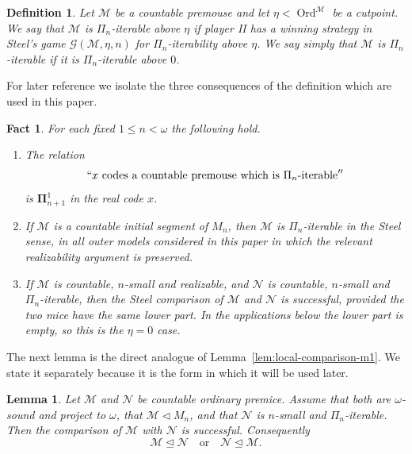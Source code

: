 \documentclass[a4paper,11pt]{article}
\newtheorem{lemma}[theorem]{Lemma}
\newtheorem{definition}[theorem]{Definition}
\newtheorem{fact}[theorem]{Fact}
\begin{document}
\begin{definition}\label{def:pin-iterability}
Let $\mathcal M$ be a countable premouse and let $\eta<\operatorname{Ord}^{\mathcal M}$ be a cutpoint.  We say that $\mathcal M$ is \emph{$\Pi_n$-iterable above $\eta$} if player II has a winning strategy in Steel's game $\mathcal G(\mathcal M,\eta,n)$ for $\Pi_n$-iterability above $\eta$.  We say simply that $\mathcal M$ is \emph{$\Pi_n$-iterable} if it is $\Pi_n$-iterable above $0$.
\end{definition}

For later reference we isolate the three consequences of the definition which are used in this paper.

\begin{fact}\label{fact:steel-pin-iterability}
For each fixed $1\leq n<\omega$ the following hold.
\begin{enumerate}
   \item The relation
   \[
      ``x\text{ codes a countable premouse which is }\Pi_n\text{-iterable}''
   \]
   is $\boldsymbol{\Pi}^1_{n+1}$ in the real code $x$.
   \item If $\mathcal M$ is a countable initial segment of $M_n$, then $\mathcal M$ is $\Pi_n$-iterable in the Steel sense, in all outer models considered in this paper in which the relevant realizability argument is preserved.
   \item If $\mathcal M$ is countable, $n$-small and realizable, and $\mathcal N$ is countable, $n$-small and $\Pi_n$-iterable, then the Steel comparison of $\mathcal M$ and $\mathcal N$ is successful, provided the two mice have the same lower part.  In the applications below the lower part is empty, so this is the $\eta=0$ case.
\end{enumerate}
\end{fact}

The next lemma is the direct analogue of Lemma~\ref{lem:local-comparison-m1}.  We state it separately because it is the form in which it will be used later.

\begin{lemma}\label{lem:local-comparison-mn}
Let $\mathcal M$ and $\mathcal N$ be countable ordinary premice.  Assume that both are $\omega$-sound and project to $\omega$, that $\mathcal M\triangleleft M_n$, and that $\mathcal N$ is $n$-small and $\Pi_n$-iterable.  Then the comparison of $\mathcal M$ with $\mathcal N$ is successful.  Consequently
\[
   \mathcal M\trianglelefteq\mathcal N
   \quad\text{or}\quad
   \mathcal N\trianglelefteq\mathcal M .
\]
\end{lemma}
\end{document}
